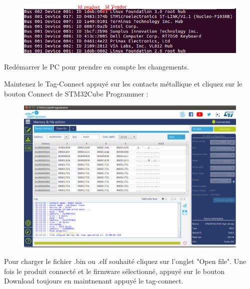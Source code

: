 \documentclass{article}
\begin{document}
\begin{figure}[H]
\begin{center}
\advance\leftskip-3cm
\advance\rightskip-3cm
\includegraphics[keepaspectratio=true,scale=0.5]{lsusb2_fleches.png}

\label{visina8}
\end{center}\end{figure}

Redémarrer le PC pour prendre en compte les changements.

Maintenez le Tag-Connect appuyé sur les contacts métallique et cliquez sur le bouton Connect de STM32Cube Programmer :
\begin{figure}[H]
\begin{center}
\advance\leftskip-3cm
\advance\rightskip-3cm
\includegraphics[keepaspectratio=true,scale=0.3]{connected.png}

\label{visina8}
\end{center}\end{figure}

Pour charger le fichier .bin ou .elf souhaité cliquez sur l'onglet "Open file".
Une fois le produit connecté et le firmware sélectionné, appuyé sur le bouton Download toujours en maintnenant appuyé le tag-connect.
\end{document}
